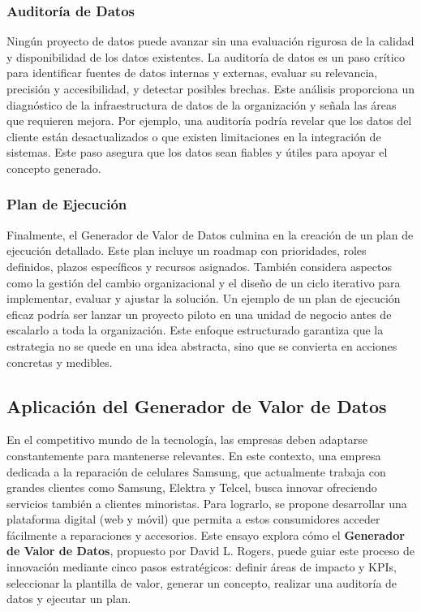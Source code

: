 \subsubsection{Auditoría de Datos}

Ningún proyecto de datos puede avanzar sin una evaluación rigurosa de la calidad
y disponibilidad de los datos existentes. La auditoría de datos es un paso
crítico para identificar fuentes de datos internas y externas, evaluar su relevancia,
precisión y accesibilidad, y detectar posibles brechas. Este análisis
proporciona un diagnóstico de la infraestructura de datos de la organización y
señala las áreas que requieren mejora. Por ejemplo, una auditoría podría revelar
que los datos del cliente están desactualizados o que existen limitaciones en la
integración de sistemas. Este paso asegura que los datos sean fiables y útiles para
apoyar el concepto generado.

\subsubsection{Plan de Ejecución}

Finalmente, el Generador de Valor de Datos culmina en la creación de un plan de ejecución
detallado. Este plan incluye un roadmap con prioridades, roles definidos, plazos
específicos y recursos asignados. También considera aspectos como la gestión del
cambio organizacional y el diseño de un ciclo iterativo para implementar,
evaluar y ajustar la solución. Un ejemplo de un plan de ejecución eficaz podría ser
lanzar un proyecto piloto en una unidad de negocio antes de escalarlo a toda la organización.
Este enfoque estructurado garantiza que la estrategia no se quede en una idea
abstracta, sino que se convierta en acciones concretas y medibles.

\clearpage
\subsection{Aplicación del Generador de Valor de Datos}

En el competitivo mundo de la tecnología, las empresas deben adaptarse constantemente
para mantenerse relevantes. En este contexto, una empresa dedicada a la reparación
de celulares Samsung, que actualmente trabaja con grandes clientes como Samsung,
Elektra y Telcel, busca innovar ofreciendo servicios también a clientes
minoristas. Para lograrlo, se propone desarrollar una plataforma digital (web y móvil)
que permita a estos consumidores acceder fácilmente a reparaciones y accesorios.
Este ensayo explora cómo el \textbf{Generador de Valor de Datos}, propuesto por David
L. Rogers, puede guiar este proceso de innovación mediante cinco pasos estratégicos:
definir áreas de impacto y KPIs, seleccionar la plantilla de valor, generar un
concepto, realizar una auditoría de datos y ejecutar un plan.

